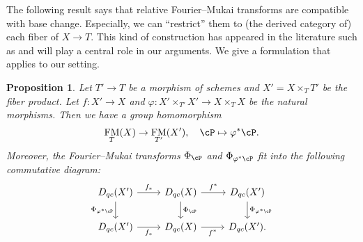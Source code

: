 \documentclass[12pt]{amsart}
\numberwithin{equation}{section}
\theoremstyle{plain}
\newtheorem{proposition}[theorem]{Proposition}
\theoremstyle{definition}
\DeclareMathOperator{\FM}{\mathrm{FM}}
\begin{document}
The following result says that relative Fourier--Mukai transforms are compatible with base change.
Especially, we can ``restrict'' them to (the derived category of) each fiber of $X \to T$.
This kind of construction has appeared in the literature such as \cite{MR2238172, MR2505443, MR2593258} and will play a central role in our arguments.
We give a formulation that applies to our setting.
\begin{proposition}\label{prop:restriction-to-fiber}
    Let $T' \to T$ be a morphism of schemes and $X' = X \times_T T'$ be the fiber product.
    Let $f \colon X' \to X$ and $\varphi \colon X' \times_{T'} X' \to X \times_T X$ be the natural morphisms.
    Then we have a group homomorphism
    \begin{equation}
        \FM_T(X) \to \FM_{T'}(X'), \quad \cP \mapsto \varphi^* \cP.
    \end{equation}
    Moreover, the Fourier--Mukai transforms $\Phi_{\cP}$ and $\Phi_{\varphi^* \cP}$ fit into the following commutative diagram:
    \begin{equation}\label{diagram:restriction-to-fiber}
        \begin{tikzcd}
            D_{qc}(X') \ar[r, "f_*"] \ar[d, "\Phi_{\varphi^* \cP}"'] & D_{qc}(X) \ar[r, "f^*"]\ar[d, "\Phi_{\cP}"] & D_{qc}(X') \ar[d,  "\Phi_{\varphi^* \cP}"]\\
            D_{qc}(X') \ar[r, "f_*"'] & D_{qc}(X) \ar[r, "f^*"'] & D_{qc}(X').
        \end{tikzcd}
    \end{equation}
\end{proposition}
\end{document}
